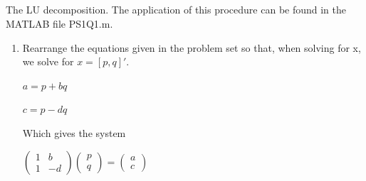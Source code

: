 \documentclass{article}
\begin{document}
\subsection{}
The LU decomposition. The application of this procedure can be found in the MATLAB file PS1Q1.m.\\
\begin{enumerate}
\item Rearrange the equations given in the problem set so that, when solving for x, we solve for $x = [p, q]'$.
\begin{center}$a= p+bq $ \end{center} \begin{center}$ c=p-dq$ \end{center}
Which gives the system

\begin{center}$ \begin{pmatrix}
  1 & b  \\
  1 & -d 
 \end{pmatrix}
 \begin{pmatrix}
  p \\
  q 
 \end{pmatrix}
 =
  \begin{pmatrix}
  a \\
  c 
 \end{pmatrix}$\end{center}


\end{enumerate}
\end{document}
